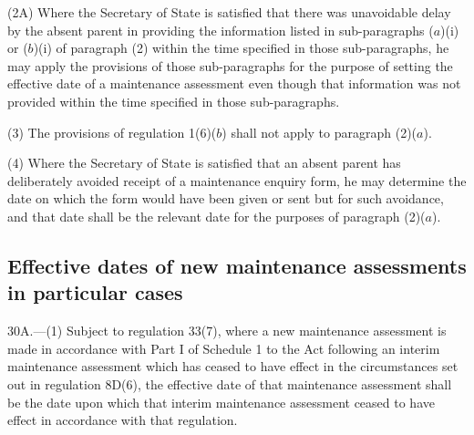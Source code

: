 \documentclass[a4paper,12pt]{article}
\begin{document}
(2A) Where 
the Secretary of State  %
is satisfied that there was unavoidable delay by the absent parent in providing the information listed in sub-paragraphs ($a$)(i) or ($b$)(i) of paragraph (2) within the time specified in those sub-paragraphs, he may apply the provisions of those sub-paragraphs for the purpose of setting the effective date of a maintenance assessment even though that information was not provided within the time specified in those sub-paragraphs.

(3) The provisions of regulation 1(6)($b$) shall not apply to paragraph (2)($a$).

(4) Where 
the Secretary of State  %
is satisfied that an absent parent has deliberately avoided receipt of a maintenance enquiry form, he may determine the date on which the form would have been given or sent but for such avoidance, and that date shall be the relevant date for the purposes of paragraph (2)($a$).


\subsection[30A. Effective dates of new maintenance assessments in particular cases]{Effective dates of new maintenance assessments in particular cases}

30A.—(1) Subject to regulation 33(7), where a new maintenance assessment is made in accordance with Part I of Schedule 1 to the Act following an interim maintenance assessment which has ceased to have effect in the circumstances set out in regulation 8D(6), the effective date of that maintenance assessment shall be the date upon which that interim maintenance assessment ceased to have effect in accordance with that regulation.
\end{document}
